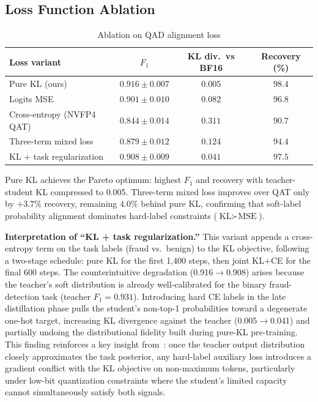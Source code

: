 \documentclass[11pt, a4paper]{article}
\begin{document}
\subsection{Loss Function Ablation}

\begin{table}[htbp]
\centering
\caption{Ablation on QAD alignment loss}
\label{tab5-en}
\small
\renewcommand{\arraystretch}{1.25}
\begin{tabular}{lccc}
\toprule
\textbf{Loss variant} & \textbf{$F_1$} & \textbf{KL div.\ vs BF16} & \textbf{Recovery (\%)} \\
\midrule
Pure KL (ours) & $\mathbf{0.916 \pm 0.007}$ & $\mathbf{0.005}$ & $\mathbf{98.4}$ \\
Logits MSE & $0.901 \pm 0.010$ & $0.082$ & $96.8$ \\
Cross-entropy (NVFP4 QAT) & $0.844 \pm 0.014$ & $0.311$ & $90.7$ \\
Three-term mixed loss & $0.879 \pm 0.012$ & $0.124$ & $94.4$ \\
KL + task regularization & $0.908 \pm 0.009$ & $0.041$ & $97.5$ \\
\bottomrule
\end{tabular}
\end{table}

Pure KL achieves the Pareto optimum: highest $F_1$ and recovery with teacher-student KL compressed to 0.005. Three-term mixed loss improves over QAT only by $+3.7\%$ recovery, remaining $4.0\%$ behind pure KL, confirming that soft-label probability alignment dominates hard-label constraints ($\text{KL}\succ \text{MSE}$).

\medskip
\noindent\textbf{Interpretation of ``KL + task regularization.''} This variant appends a cross-entropy term on the task labels (fraud vs.\ benign) to the KL objective, following a two-stage schedule: pure KL for the first 1{,}400 steps, then joint KL+CE for the final 600 steps. The counterintuitive degradation (0.916$\rightarrow$0.908) arises because the teacher's soft distribution is already well-calibrated for the binary fraud-detection task (teacher $F_1 = 0.931$). Introducing hard CE labels in the late distillation phase pulls the student's non-top-1 probabilities toward a degenerate one-hot target, increasing KL divergence against the teacher (0.005$\rightarrow$0.041) and partially undoing the distributional fidelity built during pure-KL pre-training. This finding reinforces a key insight from~\cite{3}: once the teacher output distribution closely approximates the task posterior, any hard-label auxiliary loss introduces a gradient conflict with the KL objective on non-maximum tokens, particularly under low-bit quantization constraints where the student's limited capacity cannot simultaneously satisfy both signals.
\end{document}
